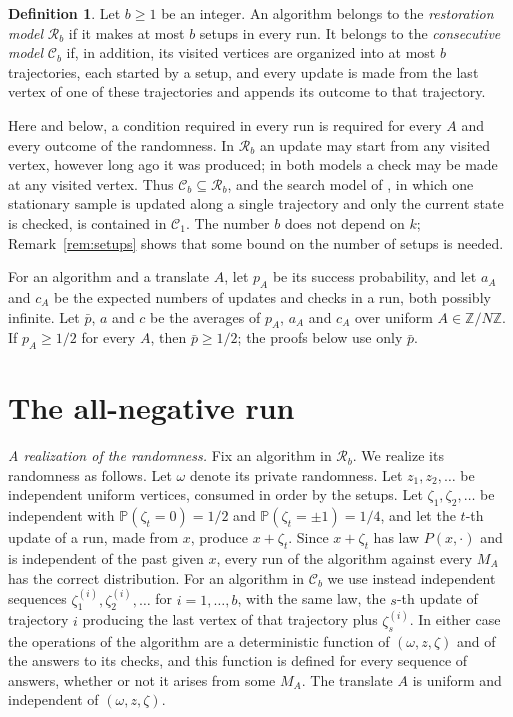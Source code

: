 \documentclass{amsart}
\theoremstyle{plain}
\theoremstyle{definition}
\newtheorem{definition}[theorem]{Definition}
\theoremstyle{remark}
\newcommand{\Z}{\mathbb{Z}}
\renewcommand{\Pr}{\mathbb{P}}
\newcommand{\res}{\mathcal{R}}
\newcommand{\con}{\mathcal{C}}
\begin{document}
\begin{definition}\label{def:models}
Let $b\ge 1$ be an integer. An algorithm belongs to the \emph{restoration model} $\res_b$ if it makes at most $b$ setups in every run. It belongs to the \emph{consecutive model} $\con_b$ if, in addition, its visited vertices are organized into at most $b$ trajectories, each started by a setup, and every update is made from the last vertex of one of these trajectories and appends its outcome to that trajectory.
\end{definition}

Here and below, a condition required in every run is required for every $A$ and every outcome of the randomness. In $\res_b$ an update may start from any visited vertex, however long ago it was produced; in both models a check may be made at any visited vertex. Thus $\con_b\subseteq\res_b$, and the search model of \cite[Section~3]{AC}, in which one stationary sample is updated along a single trajectory and only the current state is checked, is contained in $\con_1$. The number $b$ does not depend on $k$; Remark~\ref{rem:setups} shows that some bound on the number of setups is needed.

For an algorithm and a translate $A$, let $p_A$ be its success probability, and let $a_A$ and $c_A$ be the expected numbers of updates and checks in a run, both possibly infinite. Let $\bar p$, $a$ and $c$ be the averages of $p_A$, $a_A$ and $c_A$ over uniform $A\in\Z/N\Z$. If $p_A\ge 1/2$ for every $A$, then $\bar p\ge 1/2$; the proofs below use only $\bar p$.

\section{The all-negative run}\label{sec:allneg}

\emph{A realization of the randomness.}
Fix an algorithm in $\res_b$. We realize its randomness as follows. Let $\omega$ denote its private randomness. Let $z_1,z_2,\dots$ be independent uniform vertices, consumed in order by the setups. Let $\zeta_1,\zeta_2,\dots$ be independent with $\Pr(\zeta_t=0)=1/2$ and $\Pr(\zeta_t=\pm1)=1/4$, and let the $t$-th update of a run, made from $x$, produce $x+\zeta_t$. Since $x+\zeta_t$ has law $P(x,\cdot)$ and is independent of the past given $x$, every run of the algorithm against every $M_A$ has the correct distribution. For an algorithm in $\con_b$ we use instead independent sequences $\zeta^{(i)}_1,\zeta^{(i)}_2,\dots$ for $i=1,\dots,b$, with the same law, the $s$-th update of trajectory $i$ producing the last vertex of that trajectory plus $\zeta^{(i)}_s$. In either case the operations of the algorithm are a deterministic function of $(\omega,z,\zeta)$ and of the answers to its checks, and this function is defined for every sequence of answers, whether or not it arises from some $M_A$. The translate $A$ is uniform and independent of $(\omega,z,\zeta)$.
\end{document}
